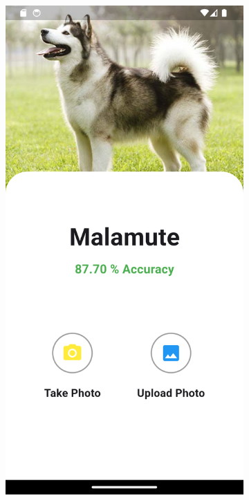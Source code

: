 \vspace{1cm}
\begin{figure}[ht]
  \centering
  \begin{subfigure}{0.45\textwidth}
    \includegraphics[width=\linewidth]{img/dog5.png}

\end{subfigure}
\end{figure}
